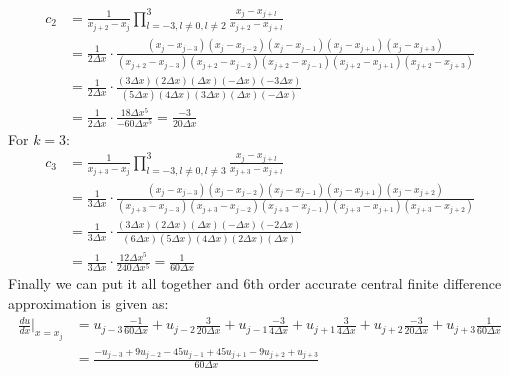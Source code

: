 \begin{equation}
	\begin{aligned}
		c_{2} & = \frac{1}{x_{j+2} - x_j} \prod_{l=-3, l \neq 0, l \neq 2}^3 \frac{x_j - x_{j+l}}{x_{j+2} - x_{j+l}}                                                                                                                    \\
		      & = \frac{1}{2\Delta x} \cdot \frac{(x_j - x_{j-3})(x_j - x_{j-2})(x_j - x_{j-1})(x_j - x_{j+1})(x_j - x_{j+3})}{(x_{j+2} - x_{j-3})(x_{j+2} - x_{j-2})(x_{j+2} - x_{j-1})(x_{j+2} - x_{j+1})(x_{j+2} - x_{j+3})} \\
		      & = \frac{1}{2\Delta x} \cdot \frac{(3\Delta x)(2\Delta x)(\Delta x)(-\Delta x)(-3\Delta x)}{(5\Delta x)(4\Delta x)(3\Delta x)(\Delta x)(-\Delta x)}                                                                 \\
		      & = \frac{1}{2\Delta x} \cdot \frac{18 \Delta x^5}{-60 \Delta x^5} = \frac{-3}{20\Delta x}
	\end{aligned}
\end{equation}
For $k = 3$:
\begin{equation}
	\begin{aligned}
		c_{3} & = \frac{1}{x_{j+3} - x_j} \prod_{l=-3, l \neq 0, l \neq 3}^3 \frac{x_j - x_{j+l}}{x_{j+3} - x_{j+l}}                                                                                                                    \\
		      & = \frac{1}{3\Delta x} \cdot \frac{(x_j - x_{j-3})(x_j - x_{j-2})(x_j - x_{j-1})(x_j - x_{j+1})(x_j - x_{j+2})}{(x_{j+3} - x_{j-3})(x_{j+3} - x_{j-2})(x_{j+3} - x_{j-1})(x_{j+3} - x_{j+1})(x_{j+3} - x_{j+2})} \\
		      & = \frac{1}{3\Delta x} \cdot \frac{(3\Delta x)(2\Delta x)(\Delta x)(-\Delta x)(-2\Delta x)}{(6\Delta x)(5\Delta x)(4\Delta x)(2\Delta x)(\Delta x)}                                                                \\
		      & = \frac{1}{3\Delta x} \cdot \frac{12 \Delta x^5}{240 \Delta x^5} = \frac{1}{60\Delta x}
	\end{aligned}
\end{equation}
Finally we can put it all together and 6th order accurate central finite difference approximation is given as:
\begin{equation}
	\begin{aligned}
		\frac{du}{dx} \bigg\vert_{x=x_j} &= u_{j-3} \frac{-1}{60\Delta x} +  u_{j-2} \frac{3}{20\Delta x} + u_{j-1} \frac{-3}{4\Delta x} + u_{j+1} \frac{3}{4\Delta x} + u_{j+2} \frac{-3}{20\Delta x} + u_{j+3}  \frac{1}{60\Delta x}\\
		&= \frac{-u_{j-3} + 9u_{j-2} - 45u_{j-1} + 45u_{j+1} - 9u_{j+2} + u_{j+3} }{60 \Delta x}
	\end{aligned}
	\label{eq:final}
\end{equation}
